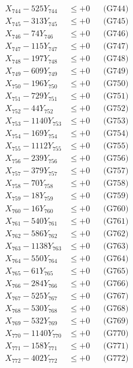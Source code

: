 \documentclass[a4paper,10pt]{article}
\begin{document}
{\begin{align}
X_{744} - 525Y_{744} &\leq +0 && \text{(G744)} \\
X_{745} - 313Y_{745} &\leq +0 && \text{(G745)} \\
X_{746} - 74Y_{746} &\leq +0 && \text{(G746)} \\
X_{747} - 115Y_{747} &\leq +0 && \text{(G747)} \\
X_{748} - 197Y_{748} &\leq +0 && \text{(G748)} \\
X_{749} - 609Y_{749} &\leq +0 && \text{(G749)} \\
X_{750} - 196Y_{750} &\leq +0 && \text{(G750)} \\
\allowbreak
X_{751} - 729Y_{751} &\leq +0 && \text{(G751)} \\
X_{752} - 44Y_{752} &\leq +0 && \text{(G752)} \\
X_{753} - 1140Y_{753} &\leq +0 && \text{(G753)} \\
X_{754} - 169Y_{754} &\leq +0 && \text{(G754)} \\
X_{755} - 1112Y_{755} &\leq +0 && \text{(G755)} \\
X_{756} - 239Y_{756} &\leq +0 && \text{(G756)} \\
X_{757} - 379Y_{757} &\leq +0 && \text{(G757)} \\
X_{758} - 70Y_{758} &\leq +0 && \text{(G758)} \\
X_{759} - 18Y_{759} &\leq +0 && \text{(G759)} \\
X_{760} - 16Y_{760} &\leq +0 && \text{(G760)} \\
\allowbreak
X_{761} - 540Y_{761} &\leq +0 && \text{(G761)} \\
X_{762} - 586Y_{762} &\leq +0 && \text{(G762)} \\
X_{763} - 1138Y_{763} &\leq +0 && \text{(G763)} \\
X_{764} - 550Y_{764} &\leq +0 && \text{(G764)} \\
X_{765} - 61Y_{765} &\leq +0 && \text{(G765)} \\
X_{766} - 284Y_{766} &\leq +0 && \text{(G766)} \\
X_{767} - 525Y_{767} &\leq +0 && \text{(G767)} \\
X_{768} - 530Y_{768} &\leq +0 && \text{(G768)} \\
X_{769} - 532Y_{769} &\leq +0 && \text{(G769)} \\
X_{770} - 1140Y_{770} &\leq +0 && \text{(G770)} \\
\allowbreak
X_{771} - 158Y_{771} &\leq +0 && \text{(G771)} \\
X_{772} - 402Y_{772} &\leq +0 && \text{(G772)} \\

\end{align}}
\end{document}
